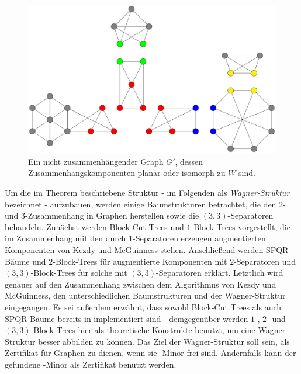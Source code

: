 \begin{figure}[H]
  \centering
  \includegraphics[width=\textwidth,height=\textheight,keepaspectratio]{bilder/WagnerTheorem2.pdf}
  \caption{Ein nicht zusammenhängender Graph $G'$, dessen Zusammenhangskomponenten planar oder isomorph zu $W$ sind.}
  \label{fig:WagnerStruktur2}
\end{figure}

Um die im Theorem beschriebene Struktur - im Folgenden als \textit{Wagner-Struktur} bezeichnet - aufzubauen, werden einige Baumstrukturen betrachtet, die den $2$- und $3$-Zusammenhang in Graphen herstellen sowie die $(3, 3)$-Separatoren behandeln.
Zunächst werden Block-Cut Trees und $1$-Block-Trees vorgestellt, die im Zusammenhang mit den durch $1$-Separatoren erzeugen augmentierten Komponenten von Kezdy und McGuinness stehen.
Anschließend werden SPQR-Bäume und $2$-Block-Trees für augmentierte Komponenten mit $2$-Separatoren und $(3, 3)$-Block-Trees für solche mit $(3, 3)$-Separatoren erklärt.
Letztlich wird genauer auf den Zusammenhang zwischen dem Algorithmus von Kezdy und McGuinness, den unterschiedlichen Baumstrukturen und der Wagner-Struktur eingegangen.
Es sei außerdem erwähnt, dass sowohl Block-Cut Trees als auch SPQR-Bäume bereits in \OGDF implementiert sind - demgegenüber werden $1$-, $2$- und $(3, 3)$-Block-Trees hier als theoretische Konstrukte benutzt, um eine Wagner-Struktur besser abbilden zu können.
Das Ziel der Wagner-Struktur soll sein, als Zertifikat für Graphen zu dienen, wenn sie \kf-Minor frei sind.
Andernfalls kann der gefundene \kf-Minor als Zertifikat benutzt werden.

